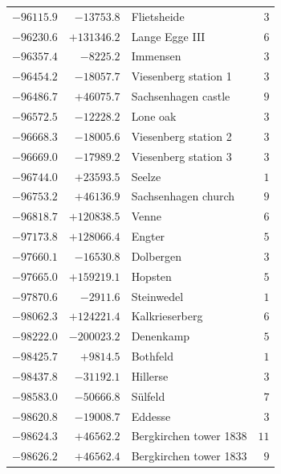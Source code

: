 \begin{center}
\begin{tabular}{r|r|p{170pt}|r}
\(-96115.9\)&\(-13753.8\)&Flietsheide&\(3\)\\
\(-96230.6\)&\(+131346.2\)&Lange Egge III&\(6\)\\
\(-96357.4\)&\(-8225.2\)&Immensen&\(3\)\\
\(-96454.2\)&\(-18057.7\)&Viesenberg station 1&\(3\)\\
\(-96486.7\)&\(+46075.7\)&Sachsenhagen castle&\(9\)\\
\(-96572.5\)&\(-12228.2\)&Lone oak&\(3\)\\
\(-96668.3\)&\(-18005.6\)&Viesenberg station 2&\(3\)\\
\(-96669.0\)&\(-17989.2\)&Viesenberg station 3&\(3\)\\
\(-96744.0\)&\(+23593.5\)&Seelze&\(1\)\\
\(-96753.2\)&\(+46136.9\)&Sachsenhagen church&\(9\)\\
\(-96818.7\)&\(+120838.5\)&Venne&\(6\)\\
\(-97173.8\)&\(+128066.4\)&Engter&\(5\)\\
\(-97660.1\)&\(-16530.8\)&Dolbergen&\(3\)\\
\(-97665.0\)&\(+159219.1\)&Hopsten&\(5\)\\
\(-97870.6\)&\(-2911.6\)&Steinwedel&\(1\)\\
\(-98062.3\)&\(+124221.4\)&Kalkrieserberg&\(6\)\\
\(-98222.0\)&\(-200023.2\)&Denenkamp&\(5\)\\
\(-98425.7\)&\(+9814.5\)&Bothfeld&\(1\)\\
\(-98437.8\)&\(-31192.1\)&Hillerse&\(3\)\\
\(-98583.0\)&\(-50666.8\)&Sülfeld&\(7\)\\
\(-98620.8\)&\(-19008.7\)&Eddesse&\(3\)\\
\(-98624.3\)&\(+46562.2\)&Bergkirchen tower 1838&\(11\)\\
\(-98626.2\)&\(+46562.4\)&Bergkirchen tower 1833&\(9\)\\
\hline\end{tabular}\endgroup\end{center}
